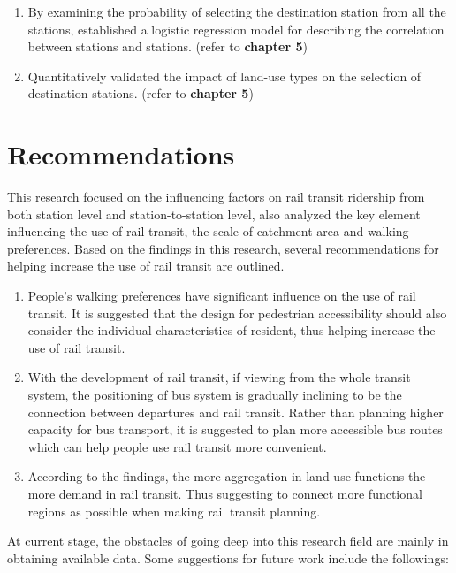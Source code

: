\begin{enumerate}
	\item By examining the probability of selecting the destination station from all the stations, established a logistic regression model for describing the correlation between stations and stations. (refer to \textbf{chapter 5})
	
	\item Quantitatively validated the impact of land-use types on the selection of destination stations. (refer to \textbf{chapter 5})
	
\end{enumerate} 

\section{Recommendations}
This research focused on the influencing factors on rail transit ridership from both station level and station-to-station level, also analyzed the key element influencing the use of rail transit, the scale of catchment area and walking preferences. Based on the findings in this research, several recommendations for helping increase the use of rail transit are outlined.

%
\begin{enumerate}
	\item People's walking preferences have significant influence on the use of rail transit. It is suggested that the design for pedestrian accessibility should also consider the individual characteristics of resident, thus helping increase the use of rail transit.
	
	\item With the development of rail transit, if viewing from the whole transit system, the positioning of bus system is gradually inclining to be the connection between departures and rail transit. Rather than planning higher capacity for bus transport, it is suggested to plan more accessible bus routes which can help people use rail transit more convenient.
	
	\item According to the findings, the more aggregation in land-use functions the more demand in rail transit. Thus suggesting to connect more functional regions as possible when making rail transit planning.
\end{enumerate}

At current stage, the obstacles of going deep into this research field are mainly in obtaining available data. Some suggestions for future work include the followings:

